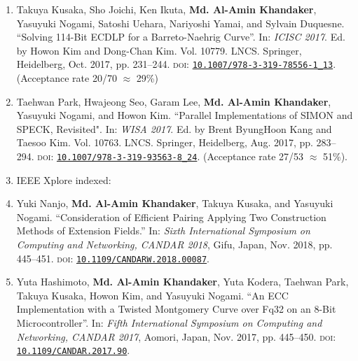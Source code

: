 \begin{enumerate}
	\item Takuya Kusaka, Sho Joichi, Ken Ikuta, \textbf{Md. Al-Amin Khandaker},  Yasuyuki Nogami, Satoshi Uehara, Nariyoshi Yamai, and Sylvain Duquesne. ``Solving 114-Bit ECDLP for a Barreto-Naehrig Curve''. In: \textit{ICISC 2017}. Ed. by Howon Kim and Dong-Chan Kim. Vol. 10779. LNCS. Springer, Heidelberg, Oct. 2017, pp. 231–244. \textsc{doi}: \href{https://doi.org/10.1007/978-3-319-78556-1_13}{\texttt{10.1007/978-3-319-78556-1\_13}}.
	(Acceptance rate 20/70 $\approx$ 29\%)
	
	\item  Taehwan Park, Hwajeong Seo, Garam Lee,\textbf{ Md. Al-Amin Khandaker}, Yasuyuki Nogami, and Howon Kim. ``Parallel Implementations of SIMON and SPECK, Revisited". In: \textit{WISA 2017}. Ed. by Brent ByungHoon Kang and Taesoo Kim. Vol. 10763. LNCS. Springer, Heidelberg, Aug. 2017, pp. 283–294. \textsc{doi}: \href{https://doi.org/10.1007/978-3-319-93563-8_24}{\texttt{10.1007/978-3-319-93563-8\_24}}.  
	(Acceptance rate 27/53 $\approx$ 51\%).
	
	\vspace{5mm}
	\item[ ] \Large IEEE Xplore indexed:
	\normalsize
	
	
	\item Yuki Nanjo, \textbf{Md. Al-Amin Khandaker}, Takuya Kusaka, and Yasuyuki Nogami. ``Consideration of Efficient Pairing Applying Two Construction Methods of Extension Fields.'' In:  \textit{Sixth International Symposium on Computing and Networking, CANDAR 2018}, Gifu, Japan, Nov. 2018, pp. 445–451. \textsc{doi}: \href{https://doi.org/10.1109/CANDARW.2018.00087}{\texttt{10.1109/CANDARW.2018.00087}}.
	
	\item Yuta Hashimoto, \textbf{Md. Al-Amin Khandaker}, Yuta Kodera, Taehwan Park, Takuya Kusaka, Howon Kim, and Yasuyuki Nogami. ``An ECC Implementation with a Twisted Montgomery Curve over Fq32 on an 8-Bit Microcontroller''. In: \textit{Fifth International Symposium on Computing and Networking, CANDAR 2017}, Aomori, Japan, Nov. 2017, pp. 445–450. \textsc{doi}: \href{https://doi.org/10.1109/CANDAR.2017.90}{\texttt{10.1109/CANDAR.2017.90}}.
	

\end{enumerate}
